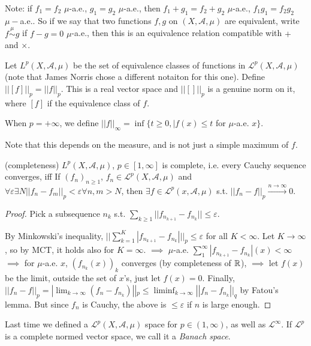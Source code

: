 \documentclass[a4paper]{article}
\begin{document}
Note: if $f_1 = f_2$ $\mu$-a.e., $g_1 = g_2$ $\mu$-a.e., then $f_1 + g_1 = f_2 + g_2$ $\mu$-a.e., $f_1 g_1 = f_2 g_2$ $\mu-$a.e.. So if we say that two functions $f,g$ on $(X,\mathcal{A},\mu)$ are equivalent, write $f \stackrel{\mu}{\sim} g $ if $f-g = 0$ $\mu$-a.e., then this is an equivalence relation compatible with $+$ and $\times$.

\begin{defi}
Let $L^p(X,\mathcal{A},\mu)$ be the set of equivalence classes of functions in $\mathcal{L}^p (X,\mathcal{A},\mu)$ (note that James Norris chose a different notaiton for this one). Define $||[f]||_p = ||f||_p$. This is a real vector space and $||[]||_p$ is a genuine norm on it, where $[f]$ if the equivalence class of $f$.
\end{defi}

\begin{defi}
When $p =+\infty$, we define $||f||_\infty = \inf \{t \geq 0, |f(x) \leq t$ for $\mu$-a.e. $x\}$.

Note that this depends on the measure, and is not just a simple maximum of $f$.
\end{defi}

\begin{prop} (completeness)
$L^p(X,\mathcal{A},\mu)$, $p \in[1,\infty]$ is complete, i.e. every Cauchy sequence converges, iff If $(f_n)_{n \geq 1}$, $f_n \in \mathcal{L}^p(X,\mathcal{A},\mu)$ and $\forall \varepsilon \exists N ||f_n - f_m||_p < \varepsilon \forall n,m > N$, then $\exists f \in \mathcal{L}^p (x,\mathcal{A},\mu)$ s.t. $||f_n-f||_p \xrightarrow{n \to \infty} 0$.
\begin{proof}
Pick a subsequence $n_k$ s.t. $\sum_{k \geq 1} ||f_{n_{k+1}}-f_{n_k} || \leq \varepsilon$. 

By Minkowski's inequality, $||\sum_{k=1}^K |f_{n_{k+1}} - f_{n_k}| ||_p \leq \varepsilon$ for all $K < \infty$. Let $K \to \infty$, so by MCT, it holds also for $K=\infty$. $\implies$ $\mu$-a.e. $\sum_1^\infty |f_{n_{k+1}}-f_{n_k}| (x) < \infty$ $\implies$ for $\mu$-a.e. $x$, $(f_{n_k}(x))_k$ converges (by completeness of $\mathbb{R}$), $\implies$ let $f(x)$ be the limit, outside the set of $x$'s, just let $f(x) = 0$. Finally, $||f_n-f||_p = |\lim_{k \to \infty} (f_n - f_{n_k})||_p \leq \liminf_{k \to \infty} ||f_n - f_{n_k}||_q$ by Fatou's lemma. But since $f_n$ is Cauchy, the above is $\leq \varepsilon$ if $n$ is large enough.
\end{proof}
\end{prop}

Last time we defined a $\mathcal{L}^p(X,\mathcal{A},\mu)$ space for $p \in (1,\infty)$, as well as $\mathcal{L}^\infty$. If $\mathcal{L}^p$ is a complete normed vector space, we call it a \emph{Banach space}.
\end{document}
